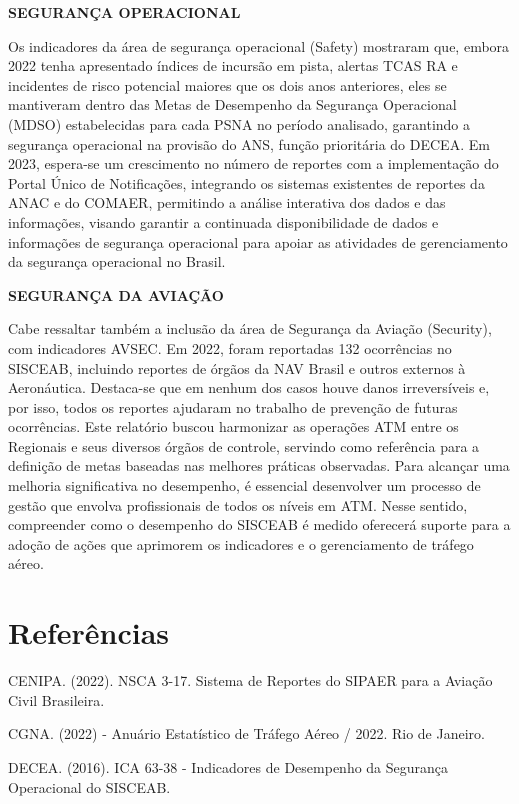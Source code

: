 \documentclass[
]{book}
\begin{document}
\textbf{SEGURANÇA OPERACIONAL}

Os indicadores da área de segurança operacional (Safety) mostraram que, embora 2022 tenha apresentado índices de incursão em pista, alertas TCAS RA e incidentes de risco potencial maiores que os dois anos anteriores, eles se mantiveram dentro das Metas de Desempenho da Segurança Operacional (MDSO) estabelecidas para cada PSNA no período analisado, garantindo a segurança operacional na provisão do ANS, função prioritária do DECEA. Em 2023, espera-se um crescimento no número de reportes com a implementação do Portal Único de Notificações, integrando os sistemas existentes de reportes da ANAC e do COMAER, permitindo a análise interativa dos dados e das informações, visando garantir a continuada disponibilidade de dados e informações de segurança operacional para apoiar as atividades de gerenciamento da segurança operacional no Brasil.

\textbf{SEGURANÇA DA AVIAÇÃO}

Cabe ressaltar também a inclusão da área de Segurança da Aviação (Security), com indicadores AVSEC. Em 2022, foram reportadas 132 ocorrências no SISCEAB, incluindo reportes de órgãos da NAV Brasil e outros externos à Aeronáutica. Destaca-se que em nenhum dos casos houve danos irreversíveis e, por isso, todos os reportes ajudaram no trabalho de prevenção de futuras ocorrências.
Este relatório buscou harmonizar as operações ATM entre os Regionais e seus diversos órgãos de controle, servindo como referência para a definição de metas baseadas nas melhores práticas observadas. Para alcançar uma melhoria significativa no desempenho, é essencial desenvolver um processo de gestão que envolva profissionais de todos os níveis em ATM. Nesse sentido, compreender como o desempenho do SISCEAB é medido oferecerá suporte para a adoção de ações que aprimorem os indicadores e o gerenciamento de tráfego aéreo.

\hypertarget{referuxeancias}{%
\chapter{Referências}\label{referuxeancias}}

CENIPA. (2022). NSCA 3-17. Sistema de Reportes do SIPAER para a Aviação Civil Brasileira.

CGNA. (2022) - Anuário Estatístico de Tráfego Aéreo / 2022. Rio de Janeiro.

DECEA. (2016). ICA 63-38 - Indicadores de Desempenho da Segurança Operacional do SISCEAB.
\end{document}
